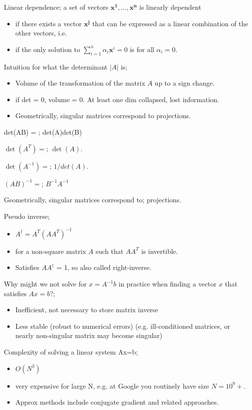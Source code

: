 \documentclass{article}
\begin{document}
	
Linear dependence; a set of vectors $\mathbf{x^1, ..., x^n}$ is linearly dependent  \begin{itemize}
	\item if there exists a vector $\mathbf{x^j}$ that can be expressed as a linear combination of the other vectors, i.e.
	\item if the only solution to $\sum_{i=1}^{n}\alpha_i\mathbf{x}^i=0$ is for all $\alpha_i = 0$.
\end{itemize}
	
Intuition for what the determinant $|A|$ is; \begin{itemize}
	\item Volume of the transformation of the matrix $A$ up to a sign change.
	\item if det = 0, volume = 0. At least one dim collapsed, lost information.
	\item Geometrically, singular matrices correspond to projections.
\end{itemize}

det(AB) = ; det(A)det(B)

$\det(A^T)=$; $\det(A)$.

$\det(A^{-1})=$; $1/det(A)$.

$(AB)^{-1}=$; $B^{-1}A^{-1}$

Geometrically, singular matrices correspond to; projections.

Pseudo inverse; \begin{itemize}
	\item $A^\dagger=A^T(AA^T)^{-1}$
	\item for a non-square matrix $A$ such that $AA^T$ is invertible.
	\item Satisfies $AA^\dagger$ = 1, so also called right-inverse.
\end{itemize}

Why might we not solve for $x=A^{-1}b$ in practice when finding a vector $x$ that satisfies $Ax=b$?; \begin{itemize}
	\item Inefficient, not necessary to store matrix inverse
	\item Less stable (robust to numerical errors) (e.g. ill-conditioned matrices, or nearly non-singular matrix may become singular)
\end{itemize}

Complexity of solving a linear system Ax=b; \begin{itemize}
	\item $O(N^3)$
	\item very expensive for large N, e.g. at Google you routinely have size $N=10^9+$.
	\item Approx methods include conjugate gradient and related approaches.
\end{itemize}
	
\end{document}
